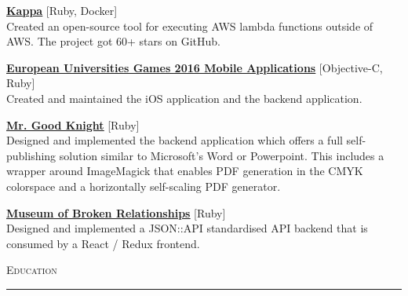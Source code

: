 \documentclass[10pt, a4paper, final, onecolumn, oneside, notitlepage]{article}
\newcommand{\gray}{\rowcolor[gray]{.92}} %
\newcommand{\sectionspacing}[0]{ \vspace{10pt} } %
\newcommand{\sectionrule}[0]{ \rule[6pt]{\textwidth}{0.5pt} } %
\renewcommand{\section}[1]{\sectionspacing {\large \scshape #1} \sectionrule}
\begin{document}
\begin{center}
\begin{flushleft}
    \textbf {\href{https://github.com/stankec/kappa}{\underline{Kappa}}} [Ruby, Docker]\\
    Created an open-source tool for executing AWS lambda functions outside of AWS. The project got 60+ stars on GitHub.
    \vspace{2mm}

    \textbf{\href{https://play.google.com/store/apps/details?id=com.eug2016.android}{\underline{European Universities Games 2016 Mobile Applications}}} [Objective-C, Ruby]\\
    Created and maintained the iOS application and the backend application. \\
    \vspace{2mm}

    \textbf{\href{https://www.mrgoodknight.de/}{\underline{Mr. Good Knight}}} [Ruby]\\
    Designed and implemented the backend application which offers a full
    self-publishing solution similar to Microsoft's Word or Powerpoint.
    This includes a wrapper around ImageMagick that enables PDF generation in the
    CMYK colorspace and a horizontally self-scaling PDF generator. \\
    \vspace{2mm}

    \textbf{\href{https://brokenships.com}{\underline{Museum of Broken Relationships}}} [Ruby]\\
    Designed and implemented a JSON::API standardised API backend that is
    consumed by a React / Redux frontend. \\
    \vspace{2mm}


  \end{flushleft}


  \section{Education}


\end{center}
\end{document}
